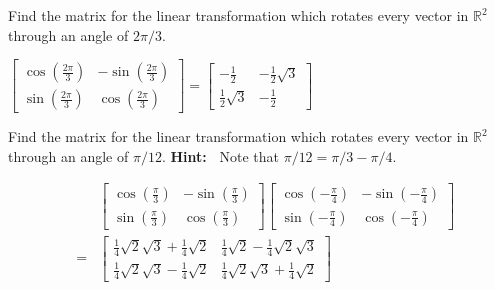 \documentclass{ximera}
\begin{document}
\begin{problem}\label{prb:6.14} Find the matrix for the linear transformation which rotates every
vector in $\mathbb{R}^{2}$ through an angle of $2\pi /3.$
\begin{hint}
$\left[
\begin{array}{cc}
\cos \left( \frac{2\pi }{3}\right) & -\sin \left( \frac{2\pi }{3}\right) \\
\sin \left( \frac{2\pi }{3}\right) & \cos \left( \frac{2\pi }{3}\right)
\end{array}
\right] = \left[
\begin{array}{cc}
-\frac{1}{2} & -\frac{1}{2}\sqrt{3} \\
\frac{1}{2}\sqrt{3} & -\frac{1}{2}
\end{array}
\right] $
\end{hint}
\end{problem}

\begin{problem}\label{prb:6.15} Find the matrix for the linear transformation which rotates every
vector in $\mathbb{R}^{2}$ through an angle of $\pi /12.$ \textbf{Hint:\ }
Note that $\pi /12=\pi /3-\pi /4.$
\begin{hint}
\begin{eqnarray*}
&&\left[
\begin{array}{cc}
\cos \left( \frac{\pi }{3}\right)  & -\sin \left( \frac{\pi }{3}\right)  \\
\sin \left( \frac{\pi }{3}\right)  & \cos \left( \frac{\pi }{3}\right)
\end{array}
\right] \left[
\begin{array}{cc}
\cos \left( -\frac{\pi }{4}\right)  & -\sin \left( -\frac{\pi }{4}\right)
\\
\sin \left( -\frac{\pi }{4}\right)  & \cos \left( -\frac{\pi }{4}\right)
\end{array}
\right]  \\
&=&\left[
\begin{array}{cc}
\frac{1}{4}\sqrt{2}\sqrt{3}+\frac{1}{4}\sqrt{2} & \frac{1}{4}\sqrt{2}-\frac{1
}{4}\sqrt{2}\sqrt{3} \\
\frac{1}{4}\sqrt{2}\sqrt{3}-\frac{1}{4}\sqrt{2} & \frac{1}{4}\sqrt{2}\sqrt{3}
+\frac{1}{4}\sqrt{2}
\end{array}
\right]
\end{eqnarray*}
\end{hint}
\end{problem}
\end{document}

